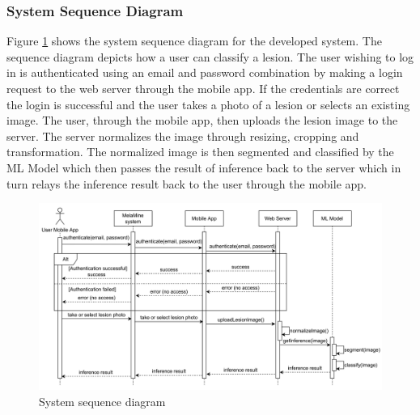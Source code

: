 \documentclass[12pt, a4paper]{article}
\begin{document}
\subsubsection{System Sequence Diagram}
Figure \ref{fig:sys-sequence-diagram} shows the system sequence diagram for the developed system. The sequence diagram depicts how a user can classify a lesion. The user wishing to log in is authenticated using an email and password combination by making a login request to the web server through the mobile app. If the credentials are correct the login is successful and the user takes a photo of a lesion or selects an existing image. The user, through the mobile app, then uploads the lesion image to the server. The server normalizes the image through resizing, cropping and transformation. The normalized image is then segmented and classified by the ML Model which then passes the result of inference back to the server which in turn relays the inference result back to the user through the mobile app.
\begin{figure}[h]
    \centering
    \setlength{\fboxsep}{8pt}
    \includegraphics[scale=0.0965, fbox]{sys-sequence-diagram.png}
    \caption{System sequence diagram}
    \label{fig:sys-sequence-diagram}
\end{figure}
\end{document}
